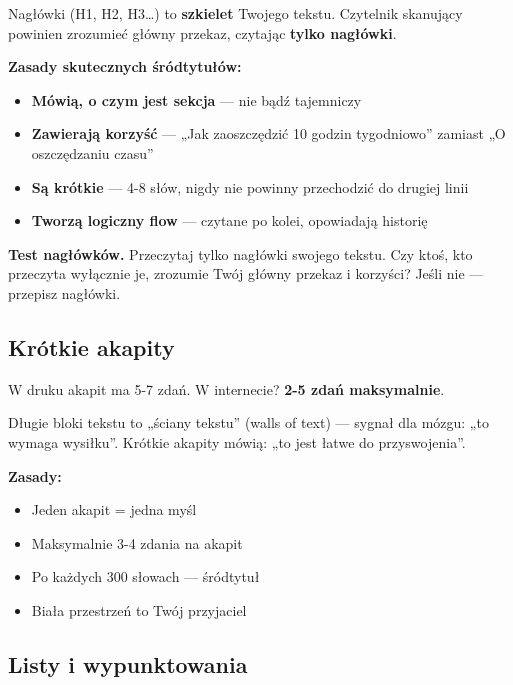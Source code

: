 \documentclass[
  12pt,
  a4paper,
  twoside,
  openright,
  12pt,
  DIV=12,
  BCOR=12mm]{scrbook}
\providecommand{\tightlist}{%
  \setlength{\itemsep}{0pt}\setlength{\parskip}{0pt}}\usepackage{longtable,booktabs,array}
\begin{document}
Nagłówki (H1, H2, H3\ldots) to \textbf{szkielet} Twojego tekstu.
Czytelnik skanujący powinien zrozumieć główny przekaz, czytając
\textbf{tylko nagłówki}.

\textbf{Zasady skutecznych śródtytułów:}

\begin{itemize}
\tightlist
\item
  \textbf{Mówią, o czym jest sekcja} --- nie bądź tajemniczy
\item
  \textbf{Zawierają korzyść} --- „Jak zaoszczędzić 10 godzin
  tygodniowo'' zamiast „O oszczędzaniu czasu''
\item
  \textbf{Są krótkie} --- 4-8 słów, nigdy nie powinny przechodzić do
  drugiej linii
\item
  \textbf{Tworzą logiczny flow} --- czytane po kolei, opowiadają
  historię
\end{itemize}

\begin{wskazowka}
\textbf{Test nagłówków.} Przeczytaj tylko nagłówki swojego tekstu. Czy ktoś, kto przeczyta wyłącznie je, zrozumie Twój główny przekaz i korzyści? Jeśli nie --- przepisz nagłówki.
\end{wskazowka}

\subsection{Krótkie akapity}\label{kruxf3tkie-akapity}

W druku akapit ma 5-7 zdań. W internecie? \textbf{2-5 zdań maksymalnie}.

Długie bloki tekstu to „ściany tekstu'' (walls of text) --- sygnał dla
mózgu: „to wymaga wysiłku''. Krótkie akapity mówią: „to jest łatwe do
przyswojenia''.

\textbf{Zasady:}

\begin{itemize}
\tightlist
\item
  Jeden akapit = jedna myśl
\item
  Maksymalnie 3-4 zdania na akapit
\item
  Po każdych 300 słowach --- śródtytuł
\item
  Biała przestrzeń to Twój przyjaciel
\end{itemize}

\subsection{Listy i wypunktowania}\label{listy-i-wypunktowania}
\end{document}
